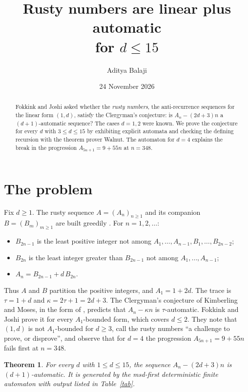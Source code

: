 \documentclass[11pt]{article}
\title{Rusty numbers are linear plus automatic\\ for \(d\le 15\)}
\author{Aditya Balaji}
\date{24 November 2026}
\newtheorem{theorem}{Theorem}\newtheorem{lemma}[theorem]{Lemma}\newtheorem{conjecture}[theorem]{Conjecture}
\theoremstyle{remark}\newtheorem{remark}[theorem]{Remark}
\begin{document}
\maketitle
\begin{abstract}
Fokkink and Joshi asked whether the \emph{rusty numbers}, the anti-recurrence sequences for the linear form \((1,d)\), satisfy the Clergyman's conjecture: is \(A_n-(2d+3)n\) a \((d+1)\)-automatic sequence? The cases \(d=1,2\) were known. We prove the conjecture for every \(d\) with \(3\le d\le 15\) by exhibiting explicit automata and checking the defining recursion with the theorem prover Walnut. The automaton for \(d=4\) explains the break in the progression \(A_{5n+1}=9+55n\) at \(n=348\).
\end{abstract}

\section{The problem}
Fix \(d\ge1\). The rusty sequence \(A=(A_n)_{n\ge1}\) and its companion \(B=(B_m)_{m\ge1}\) are built greedily \cite{fj}. For \(n=1,2,\dots\):
\begin{itemize}
\item \(B_{2n-1}\) is the least positive integer not among \(A_1,\dots,A_{n-1},B_1,\dots,B_{2n-2}\);
\item \(B_{2n}\) is the least integer greater than \(B_{2n-1}\) not among \(A_1,\dots,A_{n-1}\);
\item \(A_n=B_{2n-1}+d\,B_{2n}\).
\end{itemize}
Thus \(A\) and \(B\) partition the positive integers, and \(A_1=1+2d\). The trace is \(\tau=1+d\) and \(\kappa=2\tau+1=2d+3\). The Clergyman's conjecture of Kimberling and Moses, in the form of \cite{fj}, predicts that \(A_n-\kappa n\) is \(\tau\)-automatic. Fokkink and Joshi prove it for every \(A_1\)-bounded form, which covers \(d\le2\). They note that \((1,d)\) is not \(A_1\)-bounded for \(d\ge3\), call the rusty numbers ``a challenge to prove, or disprove'', and observe that for \(d=4\) the progression \(A_{5n+1}=9+55n\) fails first at \(n=348\).

\begin{theorem}\label{main}
For every \(d\) with \(1\le d\le 15\), the sequence \(A_n-(2d+3)n\) is \((d+1)\)-automatic. It is generated by the msd-first deterministic finite automaton with output listed in Table~\ref{tab}.
\end{theorem}
\end{document}

